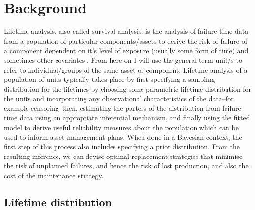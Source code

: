 \section{Background} \label{sec:lifetime-data-background}

Lifetime analysis, also called survival analysis, is the analysis of failure time data from a population of particular components/assets to derive the risk of failure of a component dependent on it's level of exposure (usually some form of time) and sometimes other covariates \citep{moore2016}. From here on I will use the general term unit/s to refer to individual/groups of the same asset or component. Lifetime analysis of a population of units typically takes place by first specifying a sampling distribution for the lifetimes by choosing some parametric lifetime distribution for the units and incorporating any observational characteristics of the data--for example censoring--then, estimating the parters of the distribution from failure time data using an appropriate inferential mechanism, and finally using the fitted model to derive useful reliability measures about the population which can be used to inform asset management plans. When done in a Bayesian context, the first step of this process also includes specifying a prior distribution. From the resulting inference, we can devise optimal replacement strategies that minimise the risk of unplanned failures, and hence the risk of lost production, and also the cost of the maintenance strategy.

\subsection{Lifetime distribution}

